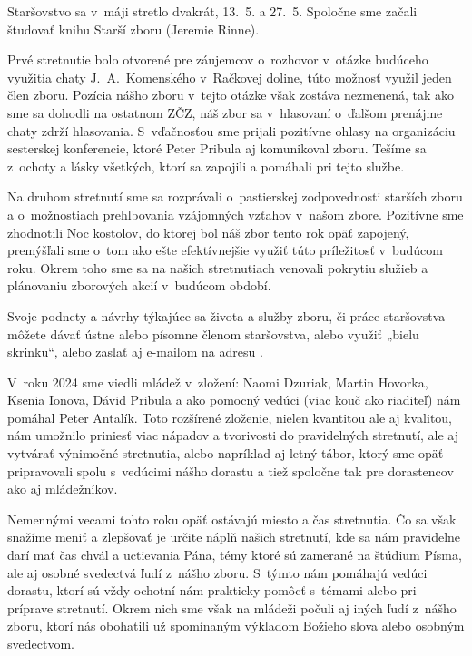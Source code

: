\def\velkostpisma{10}
\def\velkostriadku{12.5}



Staršovstvo sa v~máji stretlo dvakrát, 13.~5. a 27.~5. Spoločne sme začali študovať knihu Starší zboru (Jeremie Rinne).

Prvé stretnutie bolo otvorené pre záujemcov o~rozhovor v~otázke budúceho využitia chaty J.~A.~Komenského v~Račkovej doline, túto možnosť využil jeden člen zboru. Pozícia nášho zboru v~tejto otázke však zostáva nezmenená, tak ako sme sa dohodli na ostatnom ZČZ, náš zbor sa v~hlasovaní o~ďalšom prenájme chaty zdrží hlasovania. S~vďačnosťou sme prijali pozitívne ohlasy na organizáciu sesterskej konferencie, ktoré Peter Pribula aj komunikoval zboru. Tešíme sa z~ochoty a lásky všetkých, ktorí sa zapojili a pomáhali pri tejto službe.

Na druhom stretnutí sme sa rozprávali o~pastierskej zodpovednosti starších zboru a o~možnostiach prehlbovania vzájomných vzťahov v~našom zbore. Pozitívne sme zhodnotili Noc kostolov, do ktorej bol náš zbor tento rok opäť zapojený, premýšľali sme o~tom ako ešte efektívnejšie využiť túto príležitosť v~budúcom roku. Okrem toho sme sa na našich stretnutiach venovali pokrytiu služieb a plánovaniu zborových akcií v~budúcom období.

Svoje podnety a návrhy týkajúce sa života a služby zboru, či práce staršovstva môžete dávať ústne alebo písomne členom staršovstva, alebo využiť „bielu skrinku“, alebo zaslať aj e-mailom na adresu .



V~roku 2024 sme viedli mládež v~zložení: Naomi Dzuriak, Martin Hovorka, Ksenia Ionova, Dávid Pribula a ako pomocný vedúci (viac kouč ako riaditeľ) nám pomáhal Peter Antalík. Toto rozšírené zloženie, nielen kvantitou ale aj kvalitou, nám umožnilo priniesť viac nápadov a tvorivosti do pravidelných stretnutí, ale aj vytvárať výnimočné stretnutia, alebo napríklad aj letný tábor, ktorý sme opäť pripravovali spolu s~vedúcimi nášho dorastu a tiež spoločne tak pre dorastencov ako aj mládežníkov.

Nemennými vecami tohto roku opäť ostávajú miesto a čas stretnutia. Čo sa však snažíme meniť a zlepšovať je určite náplň našich stretnutí, kde sa nám pravidelne darí mať čas chvál a uctievania Pána, témy ktoré sú zamerané na štúdium Písma, ale aj osobné svedectvá ľudí z~nášho zboru. S~týmto nám pomáhajú vedúci dorastu, ktorí sú vždy ochotní nám prakticky pomôcť s~témami alebo pri príprave stretnutí. Okrem nich sme však na mládeži počuli aj iných ľudí z~nášho zboru, ktorí nás obohatili už spomínaným výkladom Božieho slova alebo osobným svedectvom.

